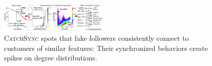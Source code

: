 \documentclass[10.5pt]{article}
\begin{document}

\vskip 0.03in


\begin{figure}
\vskip -0.15in
\includegraphics[width=0.46\textwidth]{figure/catchsync.pdf}
\vskip -0.18in
\caption{\textsc{CatchSync} \cite{jiang2014catchsync} spots that fake followers consistently connect to customers of similar features: Their synchronized behaviors create spikes on degree distributions.}
\label{fig:catchsync}
\vskip -0.12in
\end{figure}
\end{document}
